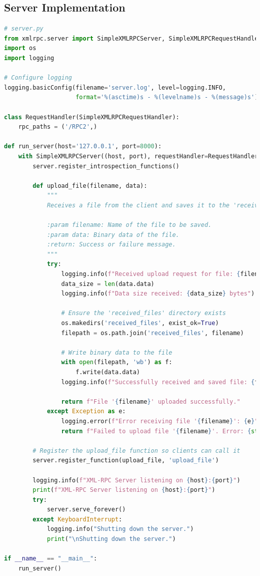 \documentclass[12pt]{article}
\begin{document}
\subsection{Server Implementation}

\begin{lstlisting}[language=Python, caption={Server-side Implementation}, label={lst:server_code}]
# server.py
from xmlrpc.server import SimpleXMLRPCServer, SimpleXMLRPCRequestHandler
import os
import logging

# Configure logging
logging.basicConfig(filename='server.log', level=logging.INFO,
                    format='%(asctime)s - %(levelname)s - %(message)s')

class RequestHandler(SimpleXMLRPCRequestHandler):
    rpc_paths = ('/RPC2',)

def run_server(host='127.0.0.1', port=8000):
    with SimpleXMLRPCServer((host, port), requestHandler=RequestHandler, allow_none=True) as server:
        server.register_introspection_functions()

        def upload_file(filename, data):
            """
            Receives a file from the client and saves it to the 'received_files' directory.
            
            :param filename: Name of the file to be saved.
            :param data: Binary data of the file.
            :return: Success or failure message.
            """
            try:
                logging.info(f"Received upload request for file: {filename}")
                data_size = len(data.data)
                logging.info(f"Data size received: {data_size} bytes")

                # Ensure the 'received_files' directory exists
                os.makedirs('received_files', exist_ok=True)
                filepath = os.path.join('received_files', filename)

                # Write binary data to the file
                with open(filepath, 'wb') as f:
                    f.write(data.data)
                logging.info(f"Successfully received and saved file: {filepath}")

                return f"File '{filename}' uploaded successfully."
            except Exception as e:
                logging.error(f"Error receiving file '{filename}': {e}")
                return f"Failed to upload file '{filename}'. Error: {str(e)}"

        # Register the upload_file function so clients can call it
        server.register_function(upload_file, 'upload_file')

        logging.info(f"XML-RPC Server listening on {host}:{port}")
        print(f"XML-RPC Server listening on {host}:{port}")
        try:
            server.serve_forever()
        except KeyboardInterrupt:
            logging.info("Shutting down the server.")
            print("\nShutting down the server.")

if __name__ == "__main__":
    run_server()
\end{lstlisting}
\end{document}

